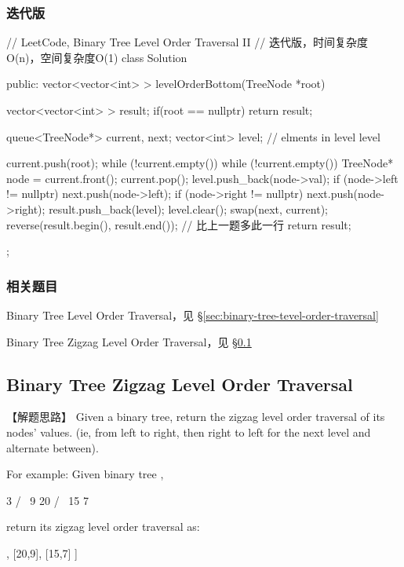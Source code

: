 \subsubsection{迭代版}
\begin{Code}
	// LeetCode, Binary Tree Level Order Traversal II
	// 迭代版，时间复杂度O(n)，空间复杂度O(1)
	class Solution {
		public:
		vector<vector<int> > levelOrderBottom(TreeNode *root) {
			vector<vector<int> > result;
			if(root == nullptr) return result;
			
			queue<TreeNode*> current, next;
			vector<int> level; // elments in level level
			
			current.push(root);
			while (!current.empty()) {
				while (!current.empty()) {
					TreeNode* node = current.front();
					current.pop();
					level.push_back(node->val);
					if (node->left != nullptr) next.push(node->left);
					if (node->right != nullptr) next.push(node->right);
				}
				result.push_back(level);
				level.clear();
				swap(next, current);
			}
			reverse(result.begin(), result.end()); // 比上一题多此一行
			return result;
		}
	};
\end{Code}


\subsubsection{相关题目}
\begindot
\item Binary Tree Level Order Traversal，见 \S \ref{sec:binary-tree-tevel-order-traversal}
\item Binary Tree Zigzag Level Order Traversal，见 \S \ref{sec:binary-tree-zigzag-level-order-traversal}
\myenddot


\subsection{Binary Tree Zigzag Level Order Traversal}
\label{sec:binary-tree-zigzag-level-order-traversal}


【解题思路】
Given a binary tree, return the zigzag level order traversal of its nodes' values. (ie, from left to right, then right to left for the next level and alternate between).

For example:
Given binary tree ,
\begin{Code}
	3
	/ \
	9  20
	/  \
	15   7
\end{Code}
return its zigzag level order traversal as:
\begin{Code}
	[
	[3],
	[20,9],
	[15,7]
	]
\end{Code}


